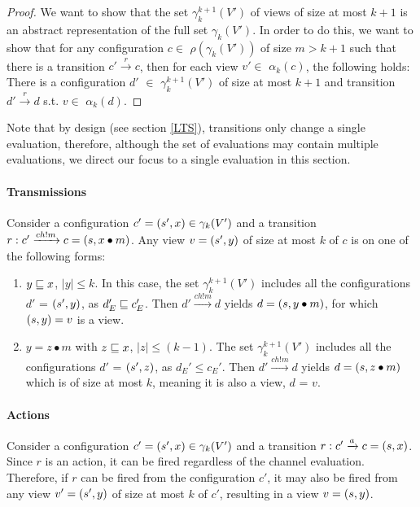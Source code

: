 \begin{proof}
\phantom\qedhere
We want to show that the set $\gamma_k^{k+1}(V')$ of views of size at most $k+1$ is an abstract representation of the full set $\gamma_k(V')$. In order to do this, 
we want to show that for any configuration $c \in$ $\rho(\gamma_k(V'))$ of size $m > k + 1$ such that there is a transition  $c' \xrightarrow{r} c$, then for each view $v' \in$ $\alpha_k(c)$, the following holds: There is a configuration $d'$ $\in$ $\gamma_k^{k+1}(V')$ of size at most $k+1$ and transition $ d' \xrightarrow{r} d$ s.t. $v \in$ $\alpha_k(d)$.
\end{proof}

Note that by design (see section \ref{LTS}), transitions only change a single evaluation, therefore, although the set of evaluations may contain multiple evaluations, we direct our focus to a single evaluation in this section.

\paragraph{Transmissions}
\label{proofTransmission}
Consider a configuration $c' = (s', x) \in \gamma_k(V')$ and a transition $r: c' \xrightarrow{ch!m} c = (s,x \bullet m)$. Any view $v = (s', y)$ of size at most $k$ of $c$ is on one of the following forms:

\begin{enumerate}
\item
$y \sqsubseteq x$, $|y| \leq k$. In this case, the set $\gamma_k^{k+1}(V')$ includes all the configurations $d'$ = $(s', y)$, as $d_E' \sqsubseteq c_E'$. Then $d' \xrightarrow{ch!m} d$ yields $d = (s, y\bullet m)$, for which $(s, y) = v$ is a view.
\item
$y = z\bullet m$ with $z \sqsubseteq x$, $|z| \leq (k-1)$. The set $\gamma_k^{k+1}(V')$ includes all the configurations $d'$ = $(s', z)$, as $d_E' \leq c_E'$. Then $d' \xrightarrow{ch!m} d$ yields $d = (s, z\bullet m)$ which is of size at most $k$, meaning it is also a view, $d$ = $v$.
\end{enumerate}


\paragraph{Actions}
Consider a configuration $c' = (s', x) \in \gamma_k(V')$ and a transition $r: c' \xrightarrow{a} c = (s, x)$. Since $r$ is an action, it can be fired regardless of the channel evaluation. Therefore, if $r$ can be fired from the configuration $c'$, it may also be fired from any view $v' = (s', y)$ of size at most $k$ of $c'$, resulting in a view $v =  (s, y)$.

